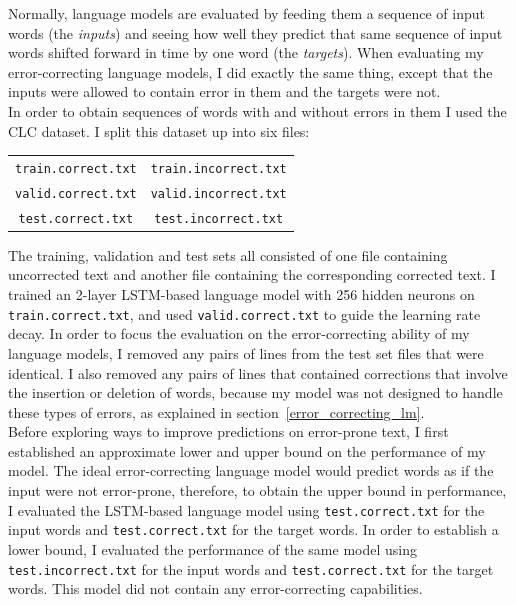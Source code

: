 \documentclass[a4paper, 12pt]{report}
\newcommand{\ttt}[1]{\texttt{#1}}
\newcommand{\tit}[1]{\textit{#1}}
\begin{document}
Normally, language models are evaluated by feeding them a sequence of input words (the \tit{inputs}) and seeing how well they predict that same sequence of input words shifted forward in time by one word (the \tit{targets}). When evaluating my error-correcting language models, I did exactly the same thing, except that the inputs were allowed to contain error in them and the targets were not. \\

In order to obtain sequences of words with and without errors in them I used the CLC dataset. I split this dataset up into six files:
\begin{center}
\begin{tabular}{c c}
	\ttt{train.correct.txt} & \ttt{train.incorrect.txt} \\
	\ttt{valid.correct.txt} & \ttt{valid.incorrect.txt} \\
	\ttt{test.correct.txt} & \ttt{test.incorrect.txt}
\end{tabular}
\end{center}
The training, validation and test sets all consisted of one file containing uncorrected text and another file containing the corresponding corrected text. I trained an 2-layer LSTM-based language model with 256 hidden neurons on \ttt{train.correct.txt}, and used \ttt{valid.correct.txt} to guide the learning rate decay. In order to focus the evaluation on the error-correcting ability of my language models, I removed any pairs of lines from the test set files that were identical. I also removed any pairs of lines that contained corrections that involve the insertion or deletion of words, because my model was not designed to handle these types of errors, as explained in section~\ref{error_correcting_lm}. \\

Before exploring ways to improve predictions on error-prone text, I first established an approximate lower and upper bound on the performance of my model. The ideal error-correcting language model would predict words as if the input were not error-prone, therefore, to obtain the upper bound in performance, I evaluated the LSTM-based language model using \ttt{test.correct.txt} for the input words and \ttt{test.correct.txt} for the target words. In order to establish a lower bound, I evaluated the performance of the same model using \ttt{test.incorrect.txt} for the input words and \ttt{test.correct.txt} for the target words. This model did not contain any error-correcting capabilities. \\
\end{document}
